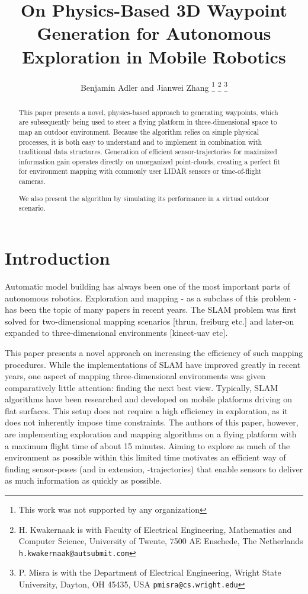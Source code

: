 \documentclass[letterpaper, 10 pt, conference]{ieeeconf}  %
\title{\LARGE \bf
On Physics-Based 3D Waypoint Generation for Autonomous Exploration in Mobile Robotics
}
\author{Benjamin Adler and Jianwei Zhang%
\thanks{This work was not supported by any organization}%
\thanks{H. Kwakernaak is with Faculty of Electrical Engineering, Mathematics and Computer Science,
        University of Twente, 7500 AE Enschede, The Netherlands
        {\tt\small h.kwakernaak@autsubmit.com}}%
\thanks{P. Misra is with the Department of Electrical Engineering, Wright State University,
        Dayton, OH 45435, USA
        {\tt\small pmisra@cs.wright.edu}}%
}
\begin{document}
\maketitle
\thispagestyle{empty}
\pagestyle{empty}



\begin{abstract}

This paper presents a novel, physics-based approach to generating waypoints, which are subsequently being used to steer a flying platform in three-dimensional space to map an outdoor environment. Because the algorithm relies on simple physical processes, it is both easy to understand and to implement in combination with traditional data structures. Generation of efficient sensor-trajectories for maximized information gain operates directly on unorganized point-clouds, creating a perfect fit for environment mapping with commonly user LIDAR sensors or time-of-flight cameras.

We also present the algorithm by simulating its performance in a virtual outdoor scenario.

\end{abstract}



\section{Introduction}

Automatic model building has always been one of the most important parts of autonomous robotics. Exploration and mapping - as a subclass of this problem - has been the topic of many papers in recent years. The SLAM problem was first solved for two-dimensional mapping scenarios [thrun, freiburg etc.] and later-on expanded to three-dimensional environments [kinect-uav etc].

This paper presents a novel approach on increasing the efficiency of such mapping procedures. While the implementations of SLAM have improved greatly in recent years, one aspect of mapping three-dimensional environments was given comparatively little attention: finding the next best view. Typically, SLAM algorithms have been researched and developed on mobile platforms driving on flat surfaces. This setup does not require a high efficiency in exploration, as it does not inherently impose time constraints. The authors of this paper, however, are implementing exploration and mapping algorithms on a flying platform with a maximum flight time of about 15 minutes. Aiming to explore as much of the environment as possible within this limited time motivates an efficient way of finding sensor-poses (and in extension, -trajectories) that enable sensors to deliver as much information as quickly as possible.
\end{document}
